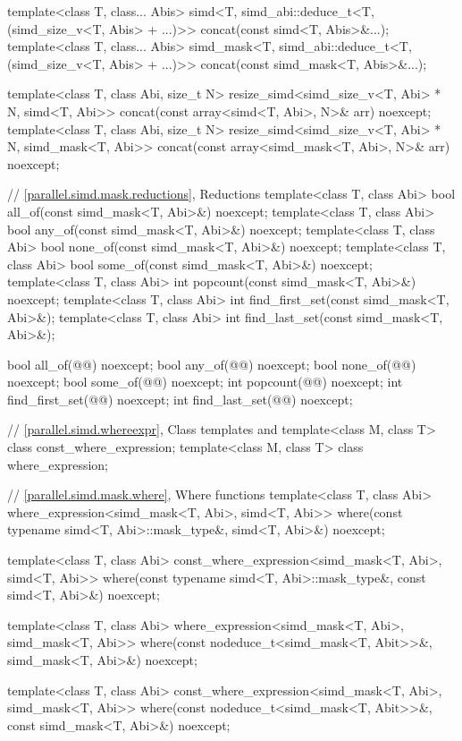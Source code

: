 \begin{codeblock}
{{  template<class T, class... Abis>
    simd<T, simd_abi::deduce_t<T, (simd_size_v<T, Abis> + ...)>>
      concat(const simd<T, Abis>&...);
  template<class T, class... Abis>
    simd_mask<T, simd_abi::deduce_t<T, (simd_size_v<T, Abis> + ...)>>
      concat(const simd_mask<T, Abis>&...);

  template<class T, class Abi, size_t N>
    resize_simd<simd_size_v<T, Abi> * N, simd<T, Abi>>
      concat(const array<simd<T, Abi>, N>& arr) noexcept;
  template<class T, class Abi, size_t N>
    resize_simd<simd_size_v<T, Abi> * N, simd_mask<T, Abi>>
      concat(const array<simd_mask<T, Abi>, N>& arr) noexcept;

  // \ref{parallel.simd.mask.reductions}, Reductions
  template<class T, class Abi> bool all_of(const simd_mask<T, Abi>&) noexcept;
  template<class T, class Abi> bool any_of(const simd_mask<T, Abi>&) noexcept;
  template<class T, class Abi> bool none_of(const simd_mask<T, Abi>&) noexcept;
  template<class T, class Abi> bool some_of(const simd_mask<T, Abi>&) noexcept;
  template<class T, class Abi> int popcount(const simd_mask<T, Abi>&) noexcept;
  template<class T, class Abi> int find_first_set(const simd_mask<T, Abi>&);
  template<class T, class Abi> int find_last_set(const simd_mask<T, Abi>&);

  bool all_of(@@) noexcept;
  bool any_of(@@) noexcept;
  bool none_of(@@) noexcept;
  bool some_of(@@) noexcept;
  int popcount(@@) noexcept;
  int find_first_set(@@) noexcept;
  int find_last_set(@@) noexcept;

  // \ref{parallel.simd.whereexpr}, Class templates  and 
  template<class M, class T> class const_where_expression;
  template<class M, class T> class where_expression;

  // \ref{parallel.simd.mask.where}, Where functions
  template<class T, class Abi>
    where_expression<simd_mask<T, Abi>, simd<T, Abi>>
      where(const typename simd<T, Abi>::mask_type&, simd<T, Abi>&) noexcept;

  template<class T, class Abi>
    const_where_expression<simd_mask<T, Abi>, simd<T, Abi>>
      where(const typename simd<T, Abi>::mask_type&, const simd<T, Abi>&) noexcept;

  template<class T, class Abi>
    where_expression<simd_mask<T, Abi>, simd_mask<T, Abi>>
      where(const nodeduce_t<simd_mask<T, Abit>>&, simd_mask<T, Abi>&) noexcept;

  template<class T, class Abi>
    const_where_expression<simd_mask<T, Abi>, simd_mask<T, Abi>>
      where(const nodeduce_t<simd_mask<T, Abit>>&, const simd_mask<T, Abi>&) noexcept;

}}
\end{codeblock}
